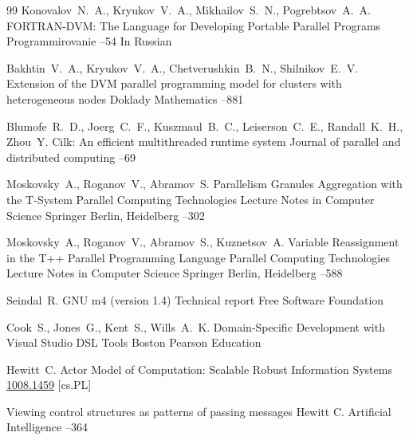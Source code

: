 \begin{thebibliography}{99}
\by Konovalov~N.~A., Kryukov~V.~A., Mikhailov~S.~N., Pogrebtsov~A.~A.
\paper FORTRAN-DVM: The Language for Developing Portable Parallel Programs
\jour Programmirovanie
--54
\lang In Russian

\by Bakhtin~V.~A., Kryukov~V.~A., Chetverushkin~B.~N., Shilnikov~E.~V.
\paper Extension of the DVM parallel programming model for clusters with heterogeneous nodes 
\jour Doklady Mathematics
--881


\by Blumofe~R.~D., Joerg~C.~F., Kuszmaul~B.~C., Leiserson~C.~E., Randall~K.~H., Zhou~Y.
\paper Cilk: An efficient multithreaded runtime system 
\jour Journal of parallel and distributed computing
--69

\by Moskovsky~A., Roganov~V., Abramov~S. 
\paper Parallelism Granules Aggregation with the T-System
\inbook Parallel Computing Technologies
\serial Lecture Notes in Computer Science
\publ Springer 
\publaddr Berlin, Heidelberg
--302

\by Moskovsky~A., Roganov~V., Abramov~S.,  Kuznetsov~A.
\paper Variable Reassignment in the T++ Parallel Programming Language
\inbook Parallel Computing Technologies
\serial Lecture Notes in Computer Science
\publ Springer 
\publaddr Berlin, Heidelberg
--588

\by Seindal~R.
\preprint GNU m4 (version 1.4)
\preprintinfo Technical report
\publ Free Software Foundation 

\by Cook~S., Jones~G., Kent~S., Wills~A.~K. 
\book Domain-Specific Development with Visual Studio DSL Tools
\publaddr Boston
\publ Pearson Education

\by Hewitt~C. 
\eprint Actor Model of Computation: Scalable Robust Information Systems
\arxiv \href{http://arxiv.org/abs/1008.1459}{1008.1459} [cs.PL]

\paper Viewing control structures as patterns of passing messages  
\by Hewitt C.  
\jour Artificial Intelligence
--364


\end{thebibliography}
